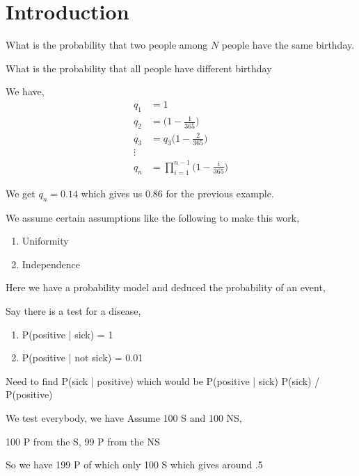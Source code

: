 \chapter{Introduction}

\begin{eg}
    What is the probability that two people among $N$ people have the same birthday.
\end{eg}

\begin{eg}
    What is the probability that all people have different birthday

    We have, 
    \begin{align*}
        q_1 &= 1\\
        q_2 &= \big ( 1 - \frac{1}{365}\big ) \\
        q_3 &= q_3 \big ( 1 - \frac{2}{365}\big ) \\
            \vdots&\\
        q_n &= \prod_{i = 1}^{n - 1} \big (  1 - \frac{i}{365}\big ) 
    \end{align*}

    We get $q_n = 0.14$ which gives us  $0.86$ for the previous example. 

\end{eg}

\begin{note}

We assume certain assumptions like the following to make this work,
\begin{enumerate}
    \item Uniformity
    \item Independence 
\end{enumerate}
\end{note}

Here we have a probability model and deduced the probability of an event,
 

\begin{eg}
    Say there is a test for a disease, 
    \begin{enumerate}
        \item P(positive | sick) = 1 
        \item P(positive | not sick) = 0.01 
    \end{enumerate}

    Need to find P(sick | positive) which would be P(positive | sick) P(sick) / P(positive)


    We test everybody, we have
    Assume 100 S and 100 NS,

    100 P from the S, 99 P from the NS

    So we have 199 P of which only 100 S which gives around .5


\end{eg}


